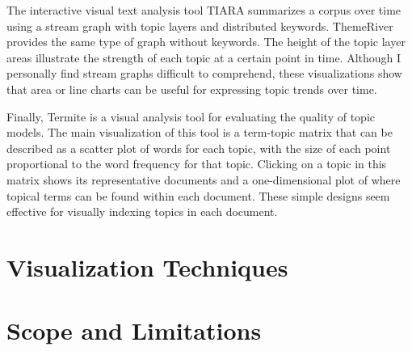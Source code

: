 The interactive visual text analysis tool TIARA \cite{tiara} summarizes a corpus over time using a stream graph with topic layers and distributed keywords. ThemeRiver \cite{theme-river} provides the same type of graph without keywords. The height of the topic layer areas illustrate the strength of each topic at a certain point in time. Although I personally find stream graphs difficult to comprehend, these visualizations show that area or line charts can be useful for expressing topic trends over time.

Finally, Termite \cite{termite} is a visual analysis tool for evaluating the quality of topic models. The main visualization of this tool is a term-topic matrix that can be described as a scatter plot of words for each topic, with the size of each point proportional to the word frequency for that topic. Clicking on a topic in this matrix shows its representative documents and a one-dimensional plot of where topical terms can be found within each document. These simple designs seem effective for visually indexing topics in each document.

\section{Visualization Techniques}



\section{Scope and Limitations}


